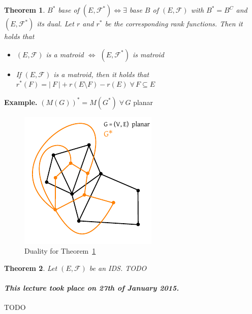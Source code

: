 \documentclass{article}
\newtheorem{theorem}{Theorem}
\newcommand{\card}[1]{\left|\:\!#1\:\!\right|}
\newcommand{\dateref}[1]{\paragraph{\textit{This lecture took place on #1.}}}
\newcommand{\fall}{\;\forall\,}
\begin{document}
\begin{theorem}
  \label{corollary-8.10}
  $B^*$ base of $(E, \mathcal{F}^*) \Leftrightarrow \exists$ base $B$ of $(E, \mathcal{F})$ with $B^* = B^C$ and $(E, \mathcal{F}^*)$ its dual. Let $r$ and $r^*$ be the corresponding rank functions.
  Then it holds that
  \begin{itemize}
    \item[a)] $(E, \mathcal{F})$ is a matroid $\Leftrightarrow$ $(E, \mathcal{F}^*)$ is matroid
    \item[b)] If $(E, \mathcal{F})$ is a matroid, then it holds that $r^*(F) = \card{F} + r(E \setminus F) - r(E) \fall F \subseteq E$
  \end{itemize}
\end{theorem}

\textbf{Example.}
  $(M(G))^* = M(G^*) \fall G$ planar
  \begin{figure}[!ht]
    \begin{center}
      \includegraphics{img/duality.pdf}
      \caption{Duality for Theorem~\ref{corollary-8.10}}
    \end{center}
  \end{figure}

\begin{theorem}
  \label{satz-8.10}
  Let $(E, \mathcal{F})$ be an IDS. TODO
\end{theorem}

\dateref{27th of January 2015}

TODO

\printindex
\end{document}
